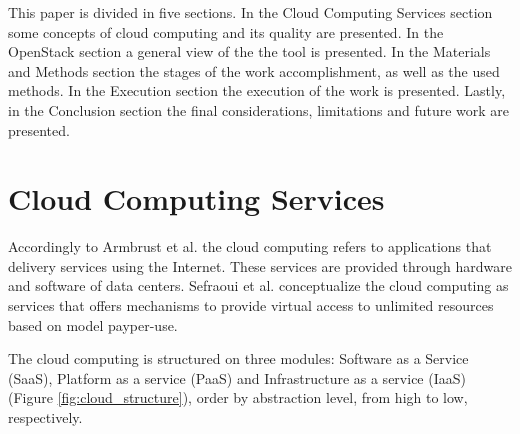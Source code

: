 \documentclass[conference]{IEEEtran}
\begin{document}
This paper is divided in five sections.
In the Cloud Computing Services section some concepts of cloud computing and its quality are presented.
In the OpenStack section a general view of the the tool is presented.
In the Materials and Methods section the stages of the work accomplishment, as well as the used methods.
In the Execution section the execution of the work is presented.
Lastly, in the Conclusion section the final considerations, limitations and future work are presented.

\section{Cloud Computing Services}

Accordingly to Armbrust et al. \cite{armbrust2010view} the cloud computing refers to applications that delivery services 
using the Internet. These services are provided through hardware and software of data centers. Sefraoui et al. conceptualize the 
cloud computing as services that offers mechanisms to provide virtual access to unlimited resources based on model payper-use.


The cloud computing is structured on three modules: Software as a Service (SaaS), Platform as a service (PaaS) and Infrastructure as a service (IaaS) (Figure \ref{fig:cloud_structure}), order by abstraction level, from high to low, respectively. 
\end{document}
